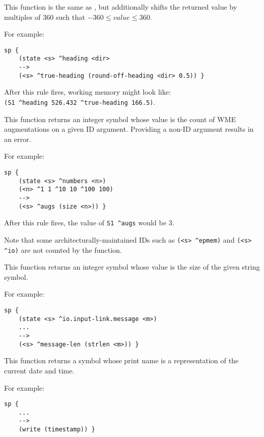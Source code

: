 \begin{description}
\item [\soarb{round-off-heading} --- ] This function is the same as ,
but additionally shifts the returned value by multiples of 360 such that $-360 \le value \le 360$.

For example:

\begin{verbatim}
sp {
    (state <s> ^heading <dir>
    -->
    (<s> ^true-heading (round-off-heading <dir> 0.5)) }
\end{verbatim}

After this rule fires, working memory might look like: \\
\verb|(S1 ^heading 526.432 ^true-heading 166.5)|.


\item [\soarb{size} --- ] This function returns an integer symbol whose value
is the count of WME augmentations on a given ID argument. Providing a non-ID
argument results in an error.

For example:

\begin{verbatim}
sp {
    (state <s> ^numbers <n>)
    (<n> ^1 1 ^10 10 ^100 100)
    -->
    (<s> ^augs (size <n>)) }
\end{verbatim}

After this rule fires, the value of \verb=S1 ^augs= would be $3$.

Note that some architecturally-maintained IDs such as \verb=(<s> ^epmem)= and \verb=(<s> ^io)=
are not counted by the  function.

\item [\soarb{strlen} --- ] This function returns an integer symbol whose value
is the size of the given string symbol.

For example:

\begin{verbatim}
sp {
    (state <s> ^io.input-link.message <m>)
    ...
    -->
    (<s> ^message-len (strlen <m>)) }
\end{verbatim}


\item [\soarb{timestamp} --- ] This function returns a symbol whose print name 
is a
representation of the current date and time. 

For example:

\begin{verbatim}
sp {
    ...
    -->
    (write (timestamp)) }
\end{verbatim}


\end{description}
